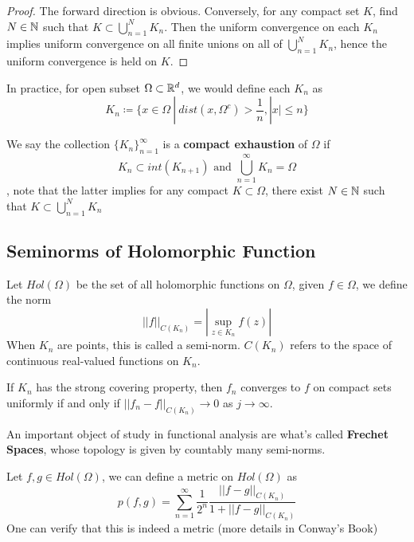 \begin{proof}
The forward direction is obvious. Conversely, for any compact set $K$, find $N \in \mathbb{N}$ such that $K \subset \bigcup_{n = 1}^N K_n$. Then the uniform convergence on each $K_n$ implies uniform convergence on all finite unions on all of $\bigcup_{n = 1}^N K_n$, hence the uniform convergence is held on $K$.
\end{proof}

\begin{remark}
In practice, for open subset $\Omega \subset \mathbb{R}^d$, we would define each $K_n$ as
\[K_n \coloneqq \{x \in \Omega\ |\ dist(x, \Omega^c) > \frac{1}{n}, |x| \leq n\}\]
\end{remark}

\begin{definition}
We say the collection $\{K_n\}_{n = 1}^\infty$ is a \textbf{compact exhaustion} of $\Omega$ if
\[K_n \subset int(K_{n+1}) \text{ and } \bigcup_{n = 1}^\infty K_n = \Omega\]
, note that the latter implies for any compact $K \subset \Omega$, there exist $N \in \mathbb{N}$ such that $K \subset \bigcup_{n = 1}^N K_n$
\end{definition}

\subsection{Seminorms of Holomorphic Function}

\begin{definition}
Let $Hol(\Omega)$ be the set of all holomorphic functions on $\Omega$, given $f \in \Omega$, we define the norm
\[||f||_{C(K_n)} = |\sup_{z \in K_n} f(z)|\]
When $K_n$ are points, this is called a semi-norm. $C(K_n)$ refers to the space of continuous real-valued functions on $K_n$.
\end{definition}

\begin{proposition}
If $K_n$ has the strong covering property, then $f_n$ converges to $f$ on compact sets uniformly if and only if $||f_n - f||_{C(K_n)} \to 0$ as $j \to \infty$.
\end{proposition}

\begin{remark}
An important object of study in functional analysis are what's called \textbf{Frechet Spaces}, whose topology is given by countably many semi-norms.
\end{remark}

\begin{definition}
Let $f, g \in Hol(\Omega)$, we can define a metric on $Hol(\Omega)$ as
\[p(f, g) = \sum_{n = 1}^\infty \frac{1}{2^n} \frac{||f - g||_{C(K_n)}}{1 + ||f - g||_{C(K_n)}}\]
One can verify that this is indeed a metric (more details in Conway's Book)
\end{definition}


